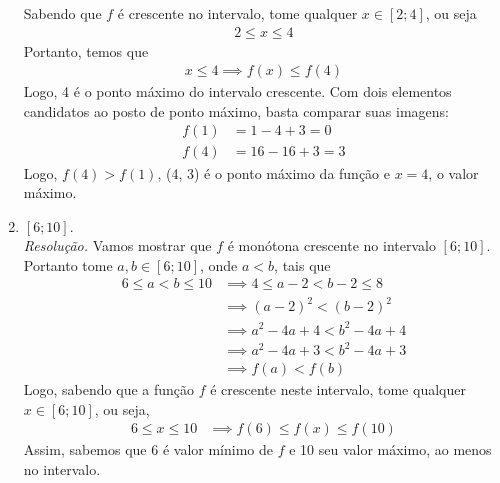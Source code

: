 \begin{enumerate}
    Sabendo que $f$ é crescente no intervalo, tome qualquer $x \in [2; 4]$, ou seja
    \begin{align*}
        2 \le x \le 4
    \end{align*}
    Portanto, temos que
    \begin{align*}
        x \le 4 \implies f(x) \le f(4)
    \end{align*}
    Logo, 4 é o ponto máximo do intervalo crescente. Com dois elementos candidatos ao posto de ponto máximo, basta comparar suas imagens:
    \begin{align*}
        f(1) &= 1 - 4 + 3 = 0 \\
        f(4) &= 16 - 16 + 3 = 3
    \end{align*}
    Logo, $f(4) > f(1)$, (4, 3) é o ponto máximo da função e $x = 4$, o valor máximo.
    \item $[6; 10]$. \\
    \emph{Resolução.} Vamos mostrar que $f$ é monótona crescente no intervalo $[6; 10]$. Portanto tome $a, b \in [6; 10]$, onde $a < b$, tais que
    \begin{align*}
        6 \le a < b \le 10 & \implies 4 \le a - 2 < b - 2 \le 8 \\ & \implies
        (a - 2)^2 < (b - 2)^2 \\ & \implies
        a^2 - 4a + 4 < b^2 - 4a + 4 \\ & \implies
        a^2 - 4a + 3 < b^2 - 4a + 3 \\ & \implies
        f(a) < f(b)
    \end{align*} 
    Logo, sabendo que a função $f$ é crescente neste intervalo, tome qualquer $x \in [6; 10]$, ou seja,
    \begin{align*}
        6 \le x \le 10 & \implies f(6) \le f(x) \le f(10)
    \end{align*}
    Assim, sabemos que 6 é valor mínimo de $f$ e 10 seu valor máximo, ao menos no intervalo.
\end{enumerate}